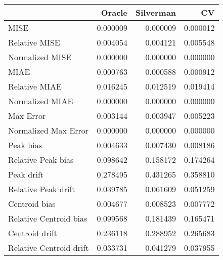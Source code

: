 \begin{tabular}{lrrr}
  \hline
 & Oracle & Silverman & CV \\ 
  \hline
MISE & 0.000009 & 0.000009 & 0.000012 \\ 
  Relative MISE & 0.004054 & 0.004121 & 0.005548 \\ 
  Normalized MISE & 0.000000 & 0.000000 & 0.000000 \\ 
  MIAE & 0.000763 & 0.000588 & 0.000912 \\ 
  Relative MIAE & 0.016245 & 0.012519 & 0.019414 \\ 
  Normalized MIAE & 0.000000 & 0.000000 & 0.000000 \\ 
  Max Error & 0.003144 & 0.003947 & 0.005223 \\ 
  Normalized Max Error & 0.000000 & 0.000000 & 0.000000 \\ 
  Peak bias & 0.004633 & 0.007430 & 0.008186 \\ 
  Relative Peak bias & 0.098642 & 0.158172 & 0.174264 \\ 
  Peak drift & 0.278495 & 0.431265 & 0.358810 \\ 
  Relative Peak drift & 0.039785 & 0.061609 & 0.051259 \\ 
  Centroid bias & 0.004677 & 0.008523 & 0.007772 \\ 
  Relative Centroid bias & 0.099568 & 0.181439 & 0.165471 \\ 
  Centroid drift & 0.236118 & 0.288952 & 0.265683 \\ 
  Relative Centroid drift & 0.033731 & 0.041279 & 0.037955 \\ 
   \hline
\end{tabular}
